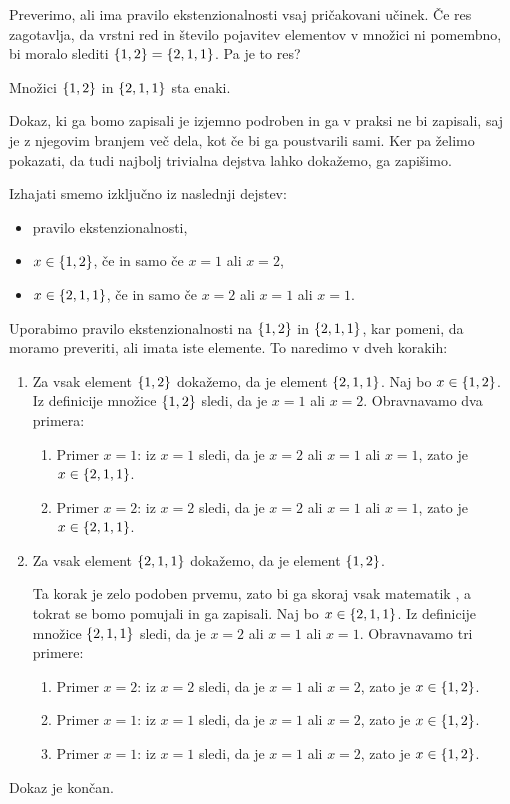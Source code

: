 Preverimo, ali ima pravilo ekstenzionalnosti vsaj pričakovani učinek.
%
Če res zagotavlja, da vrstni red in število pojavitev elementov v množici ni pomembno, bi moralo slediti
$\left\{1, 2\right\} = \left\{2, 1, 1\right\}$. Pa je to res?

\begin{trditev}
  Množici $\left\{1, 2\right\}$ in $\left\{2, 1, 1\right\}$ sta enaki.
\end{trditev}

\begin{dokaz}
  Dokaz, ki ga bomo zapisali je izjemno podroben in ga v praksi ne bi zapisali,
  saj je z njegovim branjem več dela, kot če bi ga poustvarili sami. Ker pa želimo pokazati, da
  tudi najbolj trivialna dejstva lahko dokažemo, ga zapišimo.

  Izhajati smemo izključno iz naslednji dejstev:
  \begin{itemize}
  \item pravilo ekstenzionalnosti,
  \item $x \in \left\{1, 2\right\}$, če in samo če $x = 1$ ali $x = 2$,
  \item $x \in \left\{2, 1, 1\right\}$, če in samo če $x = 2$ ali $x = 1$ ali $x = 1$.
  \end{itemize}
  Uporabimo pravilo ekstenzionalnosti na $\left\{1, 2\right\}$ in
  $\left\{2, 1, 1\right\}$, kar pomeni, da moramo preveriti, ali imata iste elemente. To
  naredimo v dveh korakih:
  \begin{enumerate}
  \item Za vsak element $\left\{1, 2\right\}$ dokažemo, da je element $\left\{2, 1, 1\right\}$.
    Naj bo $x \in \left\{1, 2\right\}$. Iz definicije množice $\left\{1, 2\right\}$
    sledi, da je $x = 1$ ali $x = 2$. Obravnavamo dva primera:
    \begin{enumerate}
    \item Primer $x = 1$: iz $x = 1$ sledi, da je $x = 2$ ali $x = 1$ ali $x = 1$, zato je $x \in \left\{2, 1, 1\right\}$.
    \item Primer $x = 2$: iz $x = 2$ sledi, da je $x = 2$ ali $x = 1$ ali $x = 1$, zato je $x \in \left\{2, 1, 1\right\}$.
    \end{enumerate}
  \item Za vsak element $\left\{2, 1, 1\right\}$ dokažemo, da je element $\left\{1, 2\right\}$.

    Ta korak je zelo podoben prvemu, zato bi ga skoraj vsak matematik ,
    a tokrat se bomo pomujali in ga zapisali.
    Naj bo $x \in \left\{2, 1, 1\right\}$. Iz definicije množice $\left\{2, 1, 1\right\}$ sledi, da je $x = 2$ ali
    $x = 1$ ali $x = 1$. Obravnavamo tri primere:
    \begin{enumerate}
    \item Primer $x = 2$: iz $x = 2$ sledi, da je $x = 1$ ali $x = 2$, zato je $x \in \left\{1, 2\right\}$.
    \item Primer $x = 1$: iz $x = 1$ sledi, da je $x = 1$ ali $x = 2$, zato je $x \in \left\{1, 2\right\}$.
    \item Primer $x = 1$: iz $x = 1$ sledi, da je $x = 1$ ali $x = 2$, zato je $x \in \left\{1, 2\right\}$.
    \end{enumerate}
  \end{enumerate}
  Dokaz je končan.
\end{dokaz}

